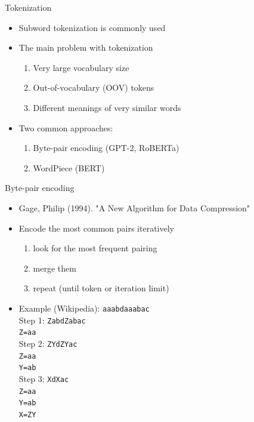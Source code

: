 \documentclass[10pt]{beamer}
\begin{document}
\begin{frame}{Tokenization}

\begin{itemize}
    \item Subword tokenization is commonly used
    \pause
    \item The main problem with tokenization
    \begin{enumerate}
        \item Very large vocabulary size
        \item Out-of-vocabulary (OOV) tokens
        \item Different meanings of very similar words
    \end{enumerate}
    \pause
    \item Two common approaches:
    \begin{enumerate}
        \item Byte-pair encoding (GPT-2, RoBERTa)
        \item WordPiece (BERT)
    \end{enumerate}
\end{itemize}

\end{frame}

\begin{frame}{Byte-pair encoding}

\begin{itemize}
    \item Gage, Philip (1994). "A New Algorithm for Data Compression"
    \pause
    \item Encode the most common pairs iteratively
\begin{enumerate}
    \item look for the most frequent pairing
    \item merge them
    \item repeat (until token or iteration limit)
\end{enumerate}

    \pause
    \item Example (Wikipedia): \texttt{aaabdaaabac}\\ \pause \vspace{2mm}
    Step 1: \texttt{ZabdZabac}\\
    \texttt{Z=aa}\\ \pause \vspace{2mm}
    Step 2: \texttt{ZYdZYac}\\
    \texttt{Z=aa}\\
    \texttt{Y=ab}\\ \pause \vspace{2mm}
    Step 3: \texttt{XdXac}\\
    \texttt{Z=aa}\\
    \texttt{Y=ab}\\
    \texttt{X=ZY}
\end{itemize}

\end{frame}
\end{document}
